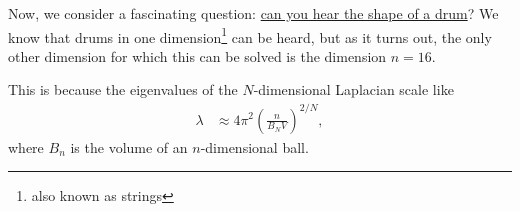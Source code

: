 \documentclass[10pt]{mypackage}
\begin{document}
  Now, we consider a fascinating question: \href{https://en.wikipedia.org/wiki/Hearing_the_shape_of_a_drum}{can you hear the shape of a drum}? We know that drums in one dimension\footnote{also known as strings} can be heard, but as it turns out, the only other dimension for which this can be solved is the dimension $n = 16$.\newline

  This is because the eigenvalues of the $N$-dimensional Laplacian scale like
  \begin{align*}
    \lambda &\approx 4\pi^2 \left( \frac{n}{B_N V} \right)^{2/N},
  \end{align*}
  where $B_n$ is the volume of an $n$-dimensional ball.
\end{document}
